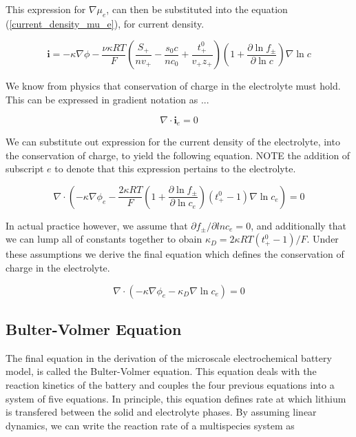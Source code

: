 \documentclass[lettersize,journal]{IEEEtran}
\begin{document}
\noindent This expression for $\nabla \mu_e$, can then be substituted into the equation (\ref{current_density_mu_e}), for current density.

\begin{equation}
\mathbf{i}=-\kappa \nabla \phi-\frac{\nu \kappa R T}{F}\left(\frac{S_{+}}{n v_{+}}-\frac{s_{0} c}{n c_{0}}+\frac{t_{+}^{0}}{v_{+} z_{+}}\right)\left(1+\frac{\partial \ln f_{\pm}}{\partial \ln c}\right) \nabla \ln c
\end{equation}

\noindent We know from physics that conservation of charge in the electrolyte must hold. This can be expressed in gradient notation as ...

\begin{equation}
  \nabla \cdot \mathbf{i}_e = 0
\end{equation}

\noindent We can substitute out expression for the current density of the electrolyte, into the conservation of charge, to yield the following equation. NOTE the addition of subscript $e$ to denote that this expression pertains to the electrolyte.

\begin{equation}
\nabla \cdot\left(-\kappa \nabla \phi_{e}-\frac{2 \kappa R T}{F}\left(1+\frac{\partial \ln f_{\pm}}{\partial \ln c_{e}}\right)\left(t_{+}^{0}-1\right) \nabla \ln c_{e}\right)=0
\end{equation}

\noindent In actual practice however, we assume that $\partial{f_{\pm}}/\partial ln {c_e} = 0 $, and additionally that we can lump all of constants together to obain $\kappa_{D}=2 \kappa R T\left(t_{+}^{0}-1\right) / F$. Under these assumptions we derive the final equation which defines the conservation of charge in the electrolyte.

\begin{equation}
\nabla \cdot\left(-\kappa \nabla \phi_{e}-\kappa_{D} \nabla \ln c_{e}\right)=0
\end{equation}


\subsection{Bulter-Volmer Equation}
The final equation in the derivation of the microscale electrochemical battery model, is called the Bulter-Volmer equation. This equation deals with the reaction kinetics of the battery and couples the four previous equations into a system of five equations. In principle, this equation defines rate at which lithium is transfered between the solid and electrolyte phases. By assuming linear dynamics, we can write the reaction rate of a multispecies system as
\end{document}
